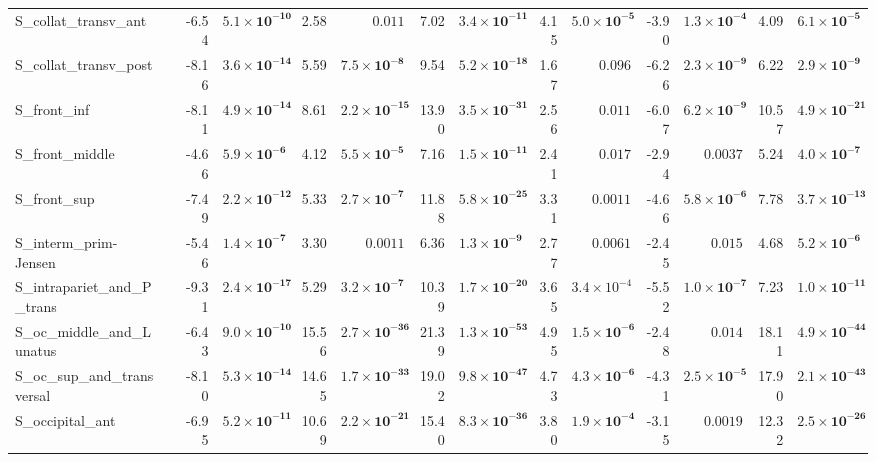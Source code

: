 {\begin{longtable}{llrrrrrrrrrrrr}
S\_collat\_transv\_ant &  & -6.54 & $\mathbf{5.1{\times}10^{-10}}$ & 2.58 & $0.011$ & 7.02 & $\mathbf{3.4{\times}10^{-11}}$ & 4.15 & $\mathbf{5.0{\times}10^{-5}}$ & -3.90 & $\mathbf{1.3{\times}10^{-4}}$ & 4.09 & $\mathbf{6.1{\times}10^{-5}}$ \\
S\_collat\_transv\_post &  & -8.16 & $\mathbf{3.6{\times}10^{-14}}$ & 5.59 & $\mathbf{7.5{\times}10^{-8}}$ & 9.54 & $\mathbf{5.2{\times}10^{-18}}$ & 1.67 & $0.096$ & -6.26 & $\mathbf{2.3{\times}10^{-9}}$ & 6.22 & $\mathbf{2.9{\times}10^{-9}}$ \\
S\_front\_inf &  & -8.11 & $\mathbf{4.9{\times}10^{-14}}$ & 8.61 & $\mathbf{2.2{\times}10^{-15}}$ & 13.90 & $\mathbf{3.5{\times}10^{-31}}$ & 2.56 & $0.011$ & -6.07 & $\mathbf{6.2{\times}10^{-9}}$ & 10.57 & $\mathbf{4.9{\times}10^{-21}}$ \\
S\_front\_middle &  & -4.66 & $\mathbf{5.9{\times}10^{-6}}$ & 4.12 & $\mathbf{5.5{\times}10^{-5}}$ & 7.16 & $\mathbf{1.5{\times}10^{-11}}$ & 2.41 & $0.017$ & -2.94 & $0.0037$ & 5.24 & $\mathbf{4.0{\times}10^{-7}}$ \\
S\_front\_sup &  & -7.49 & $\mathbf{2.2{\times}10^{-12}}$ & 5.33 & $\mathbf{2.7{\times}10^{-7}}$ & 11.88 & $\mathbf{5.8{\times}10^{-25}}$ & 3.31 & $0.0011$ & -4.66 & $\mathbf{5.8{\times}10^{-6}}$ & 7.78 & $\mathbf{3.7{\times}10^{-13}}$ \\
S\_interm\_prim-Jensen &  & -5.46 & $\mathbf{1.4{\times}10^{-7}}$ & 3.30 & $0.0011$ & 6.36 & $\mathbf{1.3{\times}10^{-9}}$ & 2.77 & $0.0061$ & -2.45 & $0.015$ & 4.68 & $\mathbf{5.2{\times}10^{-6}}$ \\
S\_intrapariet\_and\_P\_trans &  & -9.31 & $\mathbf{2.4{\times}10^{-17}}$ & 5.29 & $\mathbf{3.2{\times}10^{-7}}$ & 10.39 & $\mathbf{1.7{\times}10^{-20}}$ & 3.65 & $3.4{\times}10^{-4}$ & -5.52 & $\mathbf{1.0{\times}10^{-7}}$ & 7.23 & $\mathbf{1.0{\times}10^{-11}}$ \\
S\_oc\_middle\_and\_Lunatus &  & -6.43 & $\mathbf{9.0{\times}10^{-10}}$ & 15.56 & $\mathbf{2.7{\times}10^{-36}}$ & 21.39 & $\mathbf{1.3{\times}10^{-53}}$ & 4.95 & $\mathbf{1.5{\times}10^{-6}}$ & -2.48 & $0.014$ & 18.11 & $\mathbf{4.9{\times}10^{-44}}$ \\
S\_oc\_sup\_and\_transversal &  & -8.10 & $\mathbf{5.3{\times}10^{-14}}$ & 14.65 & $\mathbf{1.7{\times}10^{-33}}$ & 19.02 & $\mathbf{9.8{\times}10^{-47}}$ & 4.73 & $\mathbf{4.3{\times}10^{-6}}$ & -4.31 & $\mathbf{2.5{\times}10^{-5}}$ & 17.90 & $\mathbf{2.1{\times}10^{-43}}$ \\
S\_occipital\_ant &  & -6.95 & $\mathbf{5.2{\times}10^{-11}}$ & 10.69 & $\mathbf{2.2{\times}10^{-21}}$ & 15.40 & $\mathbf{8.3{\times}10^{-36}}$ & 3.80 & $\mathbf{1.9{\times}10^{-4}}$ & -3.15 & $0.0019$ & 12.32 & $\mathbf{2.5{\times}10^{-26}}$ \\

\end{longtable}}
